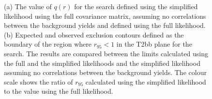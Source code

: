 \begin{figure}[hbt]
  \begin{center} 
   \caption{(a) The value of $q(r)$ for the \alphat search defined using the simplified likelihood using the full covariance matrix, assuming no correlations between the 
   background yields and defined using the full likelihood. (b) Expected and observed exclusion contours defined as 
   the boundary of the region where $r_{95} < 1$ in the T2bb plane for the \alphat search.
   The results are compared between the limits calculated using the full and the simplified likelihoods and the simplified likelihood assuming no correlations 
   between the background yields. The colour scale shows the ratio of $r_{95}$ calculated 
   using the simplified likelihood to the value using the full likelihood.}
   \label{fig:likelihoodscanAT} 
  \end{center}
\end{figure}


